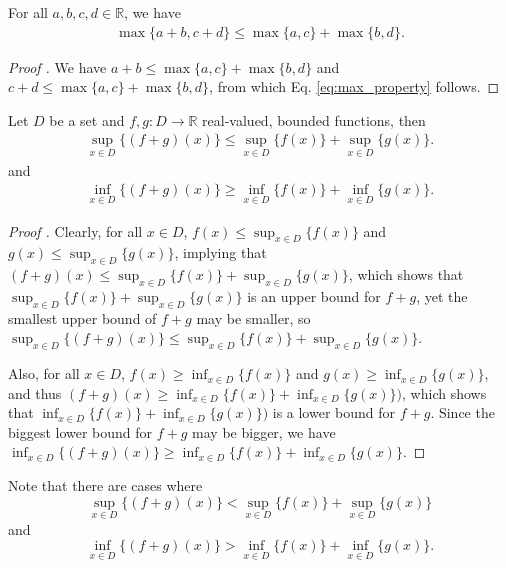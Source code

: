 \begin{theorem}\label{thrm:max_property}
	For all $a, b, c, d\in\mathbb R$, we have 
	\begin{align}\label{eq:max_property}
		\max\{a + b, c + d\} \leq \max\{a, c\} + \max\{b, d\}.
	\end{align}
\end{theorem}

\begin{proof}[Proof \cite{1975962}]
	We have $a + b \leq \max\{a, c\} + \max\{b, d\}$ and $c + d \leq \max\{a, c\} + \max\{b, d\}$, from which Eq. \eqref{eq:max_property} follows.
\end{proof}

\begin{theorem}\label{thrm:sup_inequality}
	Let $D$ be a set and $f, g: D\to \mathbb R$ real-valued, bounded functions, then 
	\begin{align}
		\sup_{x\in D}\{(f + g)(x)\} \leq \sup_{x\in D}\{f(x)\} + \sup_{x\in D}\{g(x)\}.
	\end{align}
	and
	\begin{align}
		\inf_{x\in D}\{(f+g)(x)\} \geq \inf_{x\in D}\{f(x)\} + \inf_{x\in D}\{g(x)\}.
	\end{align}
\end{theorem}

\begin{proof}[Proof \cite{207335, 207339}]
	Clearly, for all $x\in D$, $f(x) \leq \sup_{x\in D}\{f(x)\}$ and $g(x) \leq \sup_{x\in D}\{g(x)\}$, implying that $(f+g)(x) \leq \sup_{x\in D}\{f(x)\} + \sup_{x\in D}\{g(x)\}$, which shows that $\sup_{x\in D}\{f(x)\} + \sup_{x\in D}\{g(x)\}$ is an upper bound for $f+g$, yet the smallest upper bound of $f+g$ may be smaller, so $\sup_{x\in D}\{(f + g)(x)\} \leq \sup_{x\in D}\{f(x)\} + \sup_{x\in D}\{g(x)\}$.
	
	Also, for all $x\in D$, $f(x)\geq \inf_{x\in D}\{f(x)\}$ and $g(x) \geq \inf_{x\in D}\{g(x)\}$, and thus $(f+g)(x) \geq \inf_{x\in D}\{f(x)\} + \inf_{x\in D}\{g(x)\})$, which shows that $\inf_{x\in D}\{f(x)\} + \inf_{x\in D}\{g(x)\})$ is a lower bound for $f + g$. Since the biggest lower bound for $f + g$ may be bigger, we have $\inf_{x\in D}\{(f+g)(x)\} \geq \inf_{x\in D}\{f(x)\} + \inf_{x\in D}\{g(x)\}$.
\end{proof}

\begin{remark}
	Note that there are cases where $$\sup_{x\in D}\{(f + g)(x)\} < \sup_{x\in D}\{f(x)\} + \sup_{x\in D}\{g(x)\}$$ and $$\inf_{x\in D}\{(f + g)(x)\} > \inf_{x\in D}\{f(x)\} + \inf_{x\in D}\{g(x)\}.$$
\end{remark}

